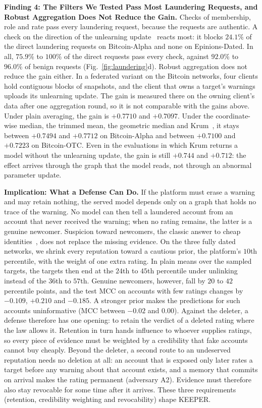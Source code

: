 \documentclass[lettersize,journal]{IEEEtran}
\begin{document}
\smallskip\noindent\textbf{Finding 4: The Filters We Tested Pass Most Laundering Requests, and Robust Aggregation Does Not Reduce the Gain.}
Checks of membership, role and rate pass every laundering request, because the requests are authentic.
A check on the direction of the unlearning update~\cite{unlearnguard2025} reacts most: it blocks $24.1\%$ of the direct laundering requests on Bitcoin-Alpha and none on Epinions-Dated.
In all, $75.9\%$ to $100\%$ of the direct requests pass every check, against $92.0\%$ to $96.0\%$ of benign requests (Fig.~\ref{fig:laundering}d).
Robust aggregation does not reduce the gain either.
In a federated variant on the Bitcoin networks, four clients hold contiguous blocks of snapshots, and the client that owns a target's warnings uploads its unlearning update.
The gain is measured there on the owning client's data after one aggregation round, so it is not comparable with the gains above.
Under plain averaging, the gain is $+0.7710$ and $+0.7097$. Under the coordinate-wise median, the trimmed mean, the geometric median and Krum~\cite{blanchard2017machine,yin2018byzantine}, it stays between $+0.7494$ and $+0.7712$ on Bitcoin-Alpha and between $+0.7100$ and $+0.7223$ on Bitcoin-OTC.
Even in the evaluations in which Krum returns a model without the unlearning update, the gain is still $+0.744$ and $+0.712$: the effect arrives through the graph that the model reads, not through an abnormal parameter update.

\smallskip\noindent\textbf{Implication: What a Defense Can Do.}
If the platform must erase a warning and may retain nothing, the served model depends only on a graph that holds no trace of the warning.
No model can then tell a laundered account from an account that never received the warning; when no rating remains, the latter is a genuine newcomer.
Suspicion toward newcomers, the classic answer to cheap identities~\cite{friedman2001social}, does not replace the missing evidence.
On the three fully dated networks, we shrink every reputation toward a cautious prior, the platform's $10$th percentile, with the weight of one extra rating.
In plain means over the sampled targets, the targets then end at the $24$th to $45$th percentile under unlinking instead of the $36$th to $57$th. Genuine newcomers, however, fall by $20$ to $42$ percentile points, and the test MCC on accounts with few ratings changes by $-0.109$, $+0.210$ and $-0.185$. A stronger prior makes the predictions for such accounts uninformative (MCC between $-0.02$ and $0.00$).
Against the deleter, a defense therefore has one opening: to retain the verdict of a deleted rating where the law allows it.
Retention in turn hands influence to whoever supplies ratings, so every piece of evidence must be weighted by a credibility that fake accounts cannot buy cheaply.
Beyond the deleter, a second route to an undeserved reputation needs no deletion at all: an account that is exposed only later rates a target before any warning about that account exists, and a memory that commits on arrival makes the rating permanent (adversary A2).
Evidence must therefore also stay revocable for some time after it arrives.
These three requirements (retention, credibility weighting and revocability) shape KEEPER.
\end{document}

